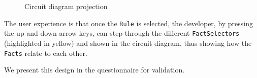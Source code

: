 \begin{figure}[h]
    \centering
    \caption{Circuit diagram projection}
    \label{fig:CircuitDiagramProjection}
\end{figure}

The user experience is that once the \texttt{Rule} is selected, the developer, by pressing the up and down arrow keys, can step through the different \texttt{FactSelectors} (highlighted in yellow) and shown in the circuit diagram, thus showing how the \texttt{Facts} relate to each other.

We present this design in the questionnaire for validation.

